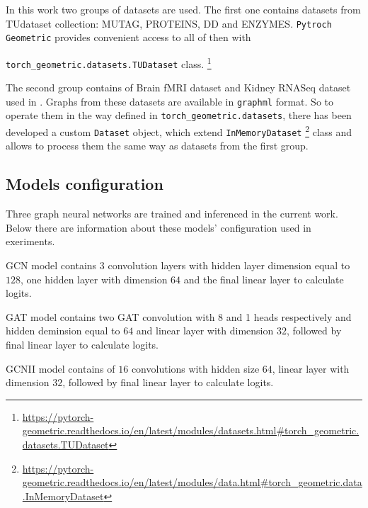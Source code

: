 


In this work two groups of datasets are used. The first one contains datasets from TUdataset\cite{TUDataset}
collection: MUTAG, PROTEINS, DD and ENZYMES. \texttt{Pytroch Geometric} provides convenient access to all of then with

\texttt{torch\_geometric.datasets.TUDataset} class.
\footnote{\url{https://pytorch-geometric.readthedocs.io/en/latest/modules/datasets.html\#torch_geometric.datasets.TUDataset}}


The second group contains of Brain fMRI dataset and Kidney RNASeq dataset used in \cite{Netpro2vec}. Graphs from 
these datasets are available in \texttt{graphml} format. So to operate them in the way 
defined in \texttt{torch\_geometric.datasets}, there has been developed a custom \texttt{Dataset} object, which 
extend \texttt{InMemoryDataset} \footnote{\url{https://pytorch-geometric.readthedocs.io/en/latest/modules/data.html\#torch_geometric.data.InMemoryDataset}}
class and allows to process them the same way as datasets from the first group.

\subsection{Models configuration}

Three graph neural networks are trained and inferenced in the current work. Below there are information
about these models' configuration used in exeriments.

GCN model contains 3 convolution layers with hidden layer dimension equal to $128$,
one hidden layer with dimension $64$ and the final linear layer to calculate logits.

GAT model contains two GAT convolution with 8 and 1 heads respectively and hidden deminsion equal to $64$
and linear layer with dimension $32$, followed by  final linear layer to calculate logits.

GCNII model contains of $16$ convolutions with hidden size $64$,  linear layer with dimension $32$,
followed by  final linear layer to calculate logits.


